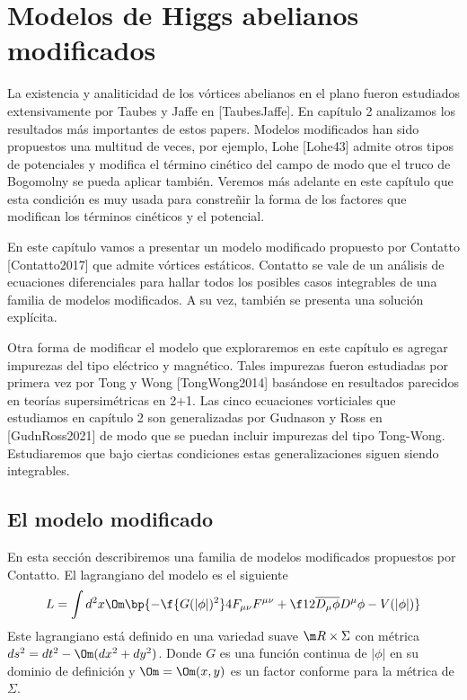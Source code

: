 
\chapter{Modelos de Higgs abelianos modificados} %

\label{ch:ahmmod} %


La existencia y analiticidad de los vórtices abelianos en el plano fueron estudiados extensivamente por Taubes y Jaffe en [TaubesJaffe]. En capítulo 2 analizamos los resultados más importantes de estos papers. Modelos modificados han sido propuestos una multitud de veces, por ejemplo, Lohe [Lohe43] admite otros tipos de potenciales y modifica el término cinético del campo de modo que el truco de Bogomolny se pueda aplicar también. Veremos más adelante en este capítulo que esta condición es muy usada para constreñir la forma de los factores que modifican los términos cinéticos y el potencial.

En este capítulo vamos a presentar un modelo modificado propuesto por Contatto [Contatto2017] que admite vórtices estáticos. Contatto se vale de un análisis de ecuaciones diferenciales para hallar todos los posibles casos integrables de una familia de modelos modificados. A su vez, también se presenta una solución explícita.

Otra forma de modificar el modelo que exploraremos en este capítulo es agregar impurezas del tipo eléctrico y magnético. Tales impurezas fueron estudiadas por primera vez por Tong y Wong [TongWong2014] basándose en resultados parecidos en teorías supersimétricas en 2+1. Las cinco ecuaciones vorticiales que estudiamos en capítulo 2 son generalizadas por Gudnason y Ross en [GudnRoss2021] de modo que se puedan incluir impurezas del tipo Tong-Wong. Estudiaremos que bajo ciertas condiciones estas generalizaciones siguen siendo integrables.

\section{El modelo modificado}

En esta sección describiremos una familia de modelos modificados propuestos por Contatto. El lagrangiano del modelo es el siguiente
\begin{align}
	L = \int d^2x \Om\bp{-\f{G(|\phi|)^2}4F_{\mu\nu}F^{\mu\nu}+\f 12\overline{D_\mu\phi}D^\mu\phi-V(|\phi|)}
\end{align}
Este lagrangiano está definido en una variedad suave $\m R\times\Sigma$ con métrica $ds^2=dt^2-\Om(dx^2+dy^2)$. Donde $G$ es una función continua de $|\phi|$ en su dominio de definición y $\Om=\Om(x,y)$ es un factor conforme para la métrica de $\Sigma$.

